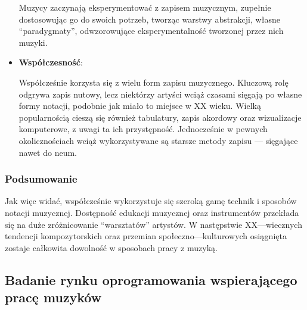 \documentclass[12pt]{article}
\begin{document}
\begin{itemize}
	      Muzycy zaczynają eksperymentować z zapisem muzycznym, zupełnie dostosowując go do swoich potrzeb, tworząc warstwy abstrakcji,
	      własne \enquote{paradygmaty}, odwzorowujące eksperymentalność tworzonej przez nich muzyki.
	\item \textbf{Współczesność}:
	      
	      Współcześnie korzysta się z wielu form zapisu muzycznego. Kluczową rolę odgrywa zapis nutowy,
	      lecz niektórzy artyści wciąż czasami sięgają po własne formy notacji, podobnie jak miało to miejsce w XX wieku.
	      Wielką popularnością cieszą się również tabulatury, zapis akordowy oraz wizualizacje komputerowe, z uwagi ta ich przystępność.
	      Jednocześnie w pewnych okolicznościach wciąż wykorzystywane są starsze metody zapisu — sięgające nawet do neum.
\end{itemize}

\subsubsection{Podsumowanie}
Jak więc widać, współcześnie wykorzystuje się szeroką gamę technik i sposobów notacji muzycznej. Dostępność edukacji muzycznej
oraz instrumentów przekłada się na duże zróżnicowanie \enquote{warsztatów} artystów. W następstwie XX—wiecznych tendencji kompozytorskich
oraz przemian społeczno—kulturowych osiągnięta zostaje całkowita dowolność w sposobach pracy z muzyką.

\subsection{Badanie rynku oprogramowania wspierającego pracę muzyków}
\end{document}
